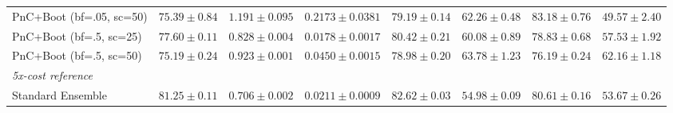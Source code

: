 \begin{table}[t]
{\begin{tabular}{l c c c c c c c}
  PnC+Boot (bf=.05, sc=50) & $75.39 \pm 0.84$ & $1.191 \pm 0.095$ & $0.2173 \pm 0.0381$ & $79.19 \pm 0.14$ & $62.26 \pm 0.48$ & \textbf{$83.18 \pm 0.76$} & \textbf{$49.57 \pm 2.40$} \\
  PnC+Boot (bf=.5, sc=25) & $77.60 \pm 0.11$ & \textbf{$0.828 \pm 0.004$} & $0.0178 \pm 0.0017$ & $80.42 \pm 0.21$ & $60.08 \pm 0.89$ & $78.83 \pm 0.68$ & $57.53 \pm 1.92$ \\
  PnC+Boot (bf=.5, sc=50) & $75.19 \pm 0.24$ & $0.923 \pm 0.001$ & $0.0450 \pm 0.0015$ & $78.98 \pm 0.20$ & $63.78 \pm 1.23$ & $76.19 \pm 0.24$ & $62.16 \pm 1.18$ \\
\midrule
\multicolumn{8}{l}{\textit{5x-cost reference}} \\
  Standard Ensemble & $81.25 \pm 0.11$ & $0.706 \pm 0.002$ & $0.0211 \pm 0.0009$ & $82.62 \pm 0.03$ & $54.98 \pm 0.09$ & $80.61 \pm 0.16$ & $53.67 \pm 0.26$ \\
\bottomrule
\end{tabular}}
\end{table}